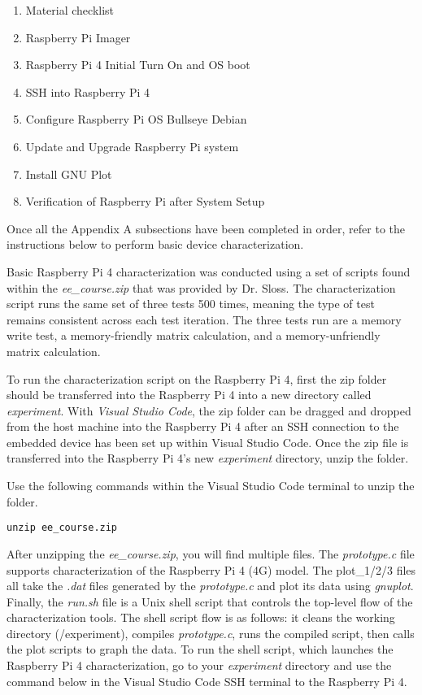 \documentclass[journal]{IEEEtran}
\begin{document}
    \begin{enumerate}
        \item Material checklist
        \item Raspberry Pi Imager
        \item Raspberry Pi 4 Initial Turn On and OS boot
        \item SSH into Raspberry Pi 4
        \item Configure Raspberry Pi OS Bullseye Debian
        \item Update and Upgrade Raspberry Pi system
        \item Install GNU Plot
        \item Verification of Raspberry Pi after System Setup
    \end{enumerate}

    Once all the Appendix A subsections have been completed in order, refer to the instructions below to perform basic device characterization.

    Basic Raspberry Pi 4 characterization was conducted using a set of scripts found within the \emph{ee\_course.zip} that was provided by Dr. Sloss. 
    The characterization script runs the same set of three tests 500 times, meaning the type of test remains consistent across each test iteration.
    The three tests run are a memory write test, a memory-friendly matrix calculation, and a memory-unfriendly matrix calculation.

    To run the characterization script on the Raspberry Pi 4, first the zip folder should be transferred into the Raspberry Pi 4 into a new directory called \emph{experiment}.
    With \emph{Visual Studio Code}, the zip folder can be dragged and dropped from the host machine into the Raspberry Pi 4 after an SSH connection to the embedded device has been set up within Visual Studio Code.
    Once the zip file is transferred into the Raspberry Pi 4's new \emph{experiment} directory, unzip the folder. \newline

    Use the following commands within the Visual Studio Code terminal to unzip the folder.

    \begin{lstlisting}[frame=single]
        unzip ee_course.zip
    \end{lstlisting}

    After unzipping the \emph{ee\_course.zip}, you will find multiple files. 
    The \emph{prototype.c} file supports characterization of the Raspberry Pi 4 (4G) model. 
    The plot\_1/2/3 files all take the \emph{.dat} files generated by the \emph{prototype.c} and plot its data using \emph{gnuplot}.
    Finally, the \emph{run.sh} file is a Unix shell script that controls the top-level flow of the characterization tools. 
    The shell script flow is as follows: it cleans the working directory (/experiment), compiles \emph{prototype.c}, runs the compiled script, then calls the plot scripts to graph the data.
    To run the shell script, which launches the Raspberry Pi 4 characterization, go to your \emph{experiment} directory and use the command below in the Visual Studio Code SSH terminal to the Raspberry Pi 4.
\end{document}
